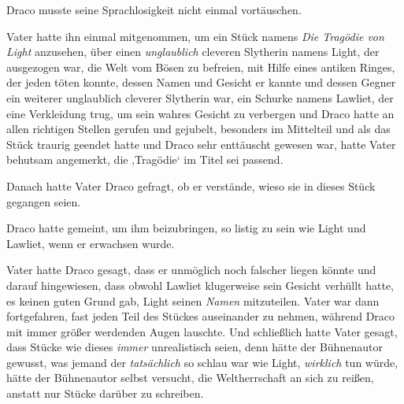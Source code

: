 Draco musste seine Sprachlosigkeit nicht einmal vortäuschen.

Vater hatte ihn einmal mitgenommen, um ein Stück namens \emph{Die Tragödie von Light} anzusehen, über einen \emph{unglaublich} cleveren Slytherin namens Light, der ausgezogen war, die Welt vom Bösen zu befreien, mit Hilfe eines antiken Ringes, der jeden töten konnte, dessen Namen und Gesicht er kannte und dessen Gegner ein weiterer unglaublich cleverer Slytherin war, ein Schurke namens Lawliet, der eine Verkleidung trug, um sein wahres Gesicht zu verbergen und Draco hatte an allen richtigen Stellen gerufen und gejubelt, besonders im Mittelteil und als das Stück traurig geendet hatte und Draco sehr enttäuscht gewesen war, hatte Vater behutsam angemerkt, die ‚Tragödie‘ im Titel sei passend.

Danach hatte Vater Draco gefragt, ob er verstände, wieso sie in dieses Stück gegangen seien.

Draco hatte gemeint, um ihm beizubringen, so listig zu sein wie Light und Lawliet, wenn er erwachsen wurde.

Vater hatte Draco gesagt, dass er unmöglich noch falscher liegen könnte und darauf hingewiesen, dass obwohl Lawliet klugerweise sein Gesicht verhüllt hatte, es keinen guten Grund gab, Light seinen \emph{Namen} mitzuteilen. Vater war dann fortgefahren, fast jeden Teil des Stückes auseinander zu nehmen, während Draco mit immer größer werdenden Augen lauschte. Und schließlich hatte Vater gesagt, dass Stücke wie dieses \emph{immer} unrealistisch seien, denn hätte der Bühnenautor gewusst, was jemand der \emph{tatsächlich} so schlau war wie Light, \emph{wirklich} tun würde, hätte der Bühnenautor selbst versucht, die Weltherrschaft an sich zu reißen, anstatt nur Stücke darüber zu schreiben.

